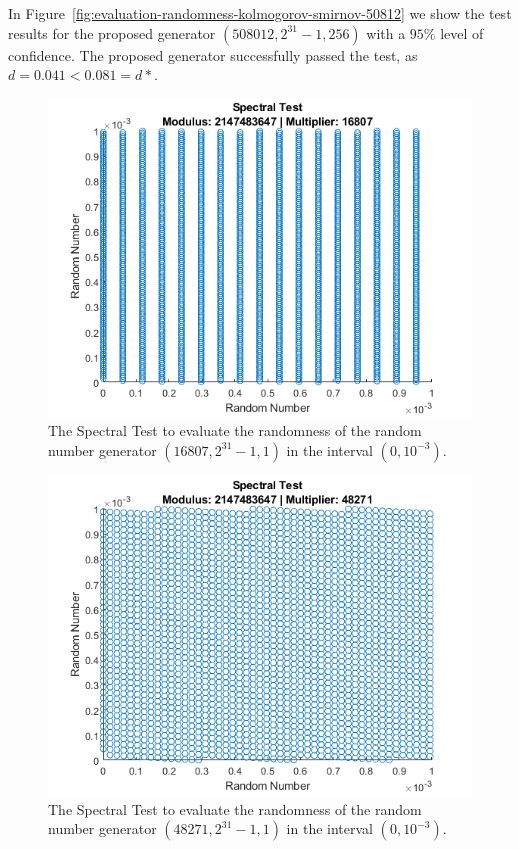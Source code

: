 \begin{itemize}
	In Figure~\ref{fig:evaluation-randomness-kolmogorov-smirnov-50812} we show the test results for the proposed generator $(508012,2^{31}-1, 256)$ with a $95\%$ level of confidence.
	The proposed generator successfully passed the test, as $d=0.041<0.081=d*$.
	
\end{itemize}

\begin{figure}
	\includegraphics[width=\columnwidth]{fig/evaluation-randomness-spectral-16807}
	\caption{The Spectral Test to evaluate the randomness of the random number generator $(16807,2^{31}-1, 1)$ in the interval $(0, 10^{-3})$.}
	\label{fig:evaluation-randomness-spectral-16807}
\end{figure}

\begin{figure}
	\includegraphics[width=\columnwidth]{fig/evaluation-randomness-spectral-48271}
	\caption{The Spectral Test to evaluate the randomness of the random number generator $(48271,2^{31}-1, 1)$ in the interval $(0, 10^{-3})$.}
	\label{fig:evaluation-randomness-spectral-48271}
\end{figure}

